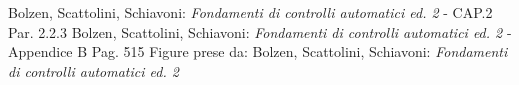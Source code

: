 \documentclass[a4paper]{report}
\begin{document}
\begin{figure}[!hbp]
  \begin{center}
    \caption{}\label{fig:}
  \end{center}
\end{figure} 

\begin{thebibliography}{99}
 Bolzen, Scattolini, Schiavoni: \emph{Fondamenti di controlli automatici ed. 2} - CAP.2 Par. 2.2.3
 Bolzen, Scattolini, Schiavoni: \emph{Fondamenti di controlli automatici ed. 2} - Appendice B Pag. 515
 Figure prese da: Bolzen, Scattolini, Schiavoni: \emph{Fondamenti di controlli automatici ed. 2} 
\end{thebibliography}

\printindex
\end{document}
